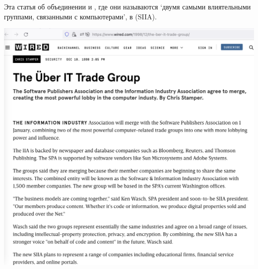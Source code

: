 
Эта статья об объединении \Spa и \Iia,
где они называются `двумя самыми влиятельными группами, связанными с компьютерами', в \Siia (SIIA).

\begin{center}
    \includegraphics[width=\textwidth]{wired}
\end{center}

\pagebreak
